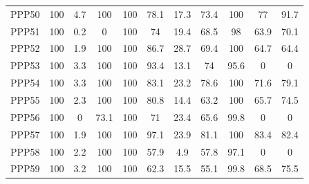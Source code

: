 \documentclass[authoryearcitations]{UoYCSproject}
\begin{document}
\begin{appendices}
\begin{table}
\begin{tabular}{|l|c|c|c|c|c|c|c|c|c|c}
PPP50&100&4.7&100&100&78.1&17.3&73.4&100&77&91.7\\
PPP51&100&0.2&0&100&74&19.4&68.5&98&63.9&70.1\\
PPP52&100&1.9&100&100&86.7&28.7&69.4&100&64.7&64.4\\
PPP53&100&3.3&100&100&93.4&13.1&74&95.6&0&0\\
PPP54&100&3.3&100&100&83.1&23.2&78.6&100&71.6&79.1\\
PPP55&100&2.3&100&100&80.8&14.4&63.2&100&65.7&74.5\\
PPP56&100&0&73.1&100&71&23.4&65.6&99.8&0&0\\
PPP57&100&1.9&100&100&97.1&23.9&81.1&100&83.4&82.4\\
PPP58&100&2.2&100&100&57.9&4.9&57.8&97.1&0&0\\
PPP59&100&3.2&100&100&62.3&15.5&55.1&99.8&68.5&75.5\\
\end{tabular}
\end{table}


\end{appendices}
\end{document}
